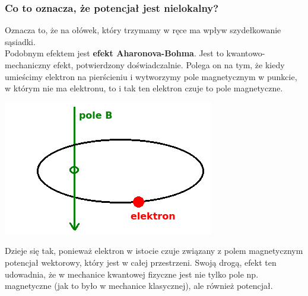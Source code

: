 \subsubsection{Co to oznacza, że potencjał jest nielokalny?}
Oznacza to, że na ołówek, który trzymamy w ręce ma wpływ szydełkowanie sąsiadki.\\ Podobnym efektem jest\textbf{ efekt Aharonova-Bohma}. Jest to kwantowo-mechaniczny efekt, potwierdzony doświadczalnie. Polega on na tym, że kiedy umieścimy elektron na pierścieniu i wytworzymy pole magnetycznym w punkcie, w którym nie ma elektronu, to i tak ten elektron czuje to pole magnetyczne.
\begin{center}
\includegraphics[scale=0.5]{obrazki/wykl_13_obrazek1.png}
\end{center}
 Dzieje się tak, ponieważ elektron w istocie czuje związany z polem magnetycznym potencjał wektorowy, który jest w całej przestrzeni. Swoją drogą, efekt ten udowadnia, że w mechanice kwantowej fizyczne jest nie tylko pole np. magnetyczne (jak to było w mechanice klasycznej), ale również potencjał.\\
